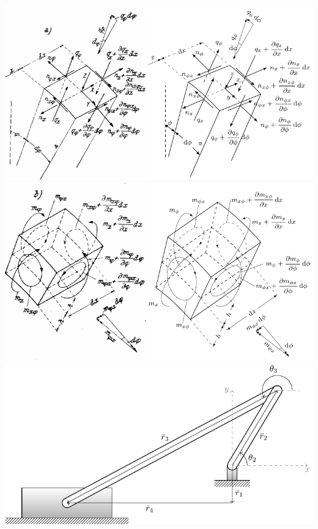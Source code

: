     \clearpage
    \begin{center}
        \includegraphics[width=0.8\linewidth]{./TikZimages/TikZ7.pdf}\\
        \vfill
        \includegraphics[width=0.8\linewidth]{./TikZimages/TikZ8.pdf}\\
        \vfill
        \includegraphics[width=0.8\linewidth]{./TikZimages/TikZ9.pdf}
    \end{center}
    \clearpage
